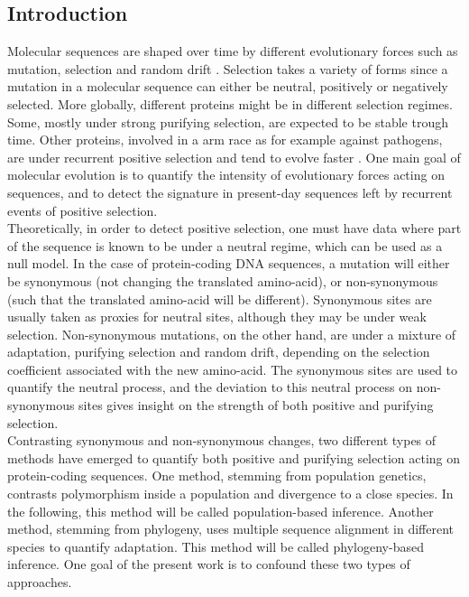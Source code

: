 \documentclass[10pt]{article}
\begin{document}
	\begin{multicols}{2}
	\section*{Introduction}

	Molecular sequences are shaped over time by different evolutionary forces such as mutation, selection and random drift \cite{ohta_nearly_1992}. Selection takes a variety of forms since a mutation in a molecular sequence can either be neutral, positively or negatively selected. More globally, different proteins might be in different selection regimes. Some, mostly under strong purifying selection, are expected to be stable trough time.
	Other proteins, involved in a arm race as for example against pathogens, are under recurrent positive selection and tend to evolve faster \cite{enard_viruses_2016}. One main goal of molecular evolution is to quantify the intensity of evolutionary forces acting on sequences, and to detect the signature in present-day sequences left by recurrent events of positive selection. \\
	
	Theoretically, in order to detect positive selection, one must have data where part of the sequence is known to be under a neutral regime, which can be used as a null model. In the case of protein-coding DNA sequences, a mutation will either be synonymous (not changing the translated amino-acid), or non-synonymous (such that the translated amino-acid will be different). Synonymous sites are usually taken as proxies for neutral sites, although they may be under weak selection. Non-synonymous mutations, on the other hand, are under a mixture of adaptation, purifying selection and random drift, depending on the selection coefficient associated with the new amino-acid. The synonymous sites are used to quantify the neutral process, and the deviation to this neutral process on non-synonymous sites gives insight on the strength of both positive and purifying selection. \\
	
	Contrasting synonymous and non-synonymous changes, two different types of methods have emerged to quantify both positive and purifying selection acting on protein-coding sequences.
	One method, stemming from population genetics, contrasts polymorphism inside a population and divergence to a close species. In the following, this method will be called population-based inference. Another method, stemming from phylogeny, uses multiple sequence alignment in different species to quantify adaptation. This method will be called phylogeny-based inference. One goal of the present work is to confound these two types of approaches.\\
	

\end{multicols}
\end{document}
